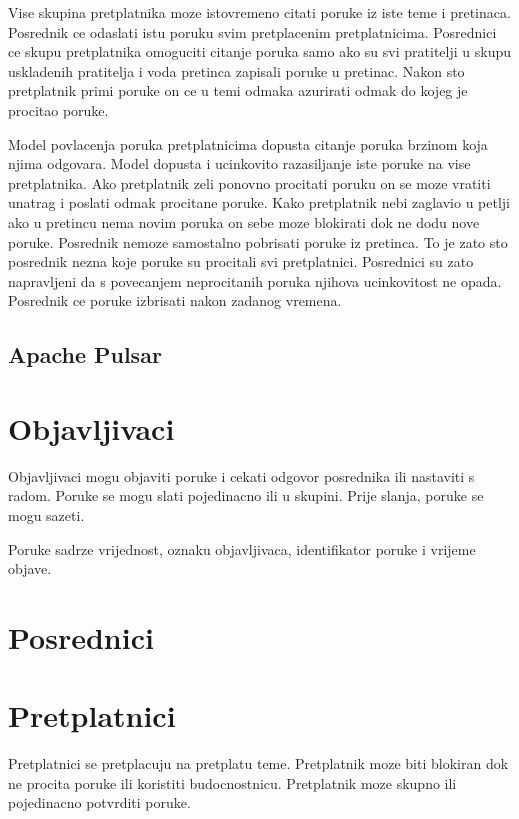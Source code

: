 \documentclass[times, utf8, diplomski, numeric]{fer}
\begin{document}
Vise skupina pretplatnika moze istovremeno citati poruke iz iste teme i pretinaca. Posrednik ce odaslati istu poruku svim pretplacenim pretplatnicima. Posrednici ce skupu pretplatnika omoguciti citanje poruka samo ako su svi pratitelji u skupu uskladenih pratitelja i voda pretinca zapisali poruke u pretinac. Nakon sto pretplatnik primi poruke on ce u temi odmaka azurirati odmak do kojeg je procitao poruke.

Model povlacenja poruka pretplatnicima dopusta citanje poruka brzinom koja njima odgovara. Model dopusta i ucinkovito razasiljanje iste poruke na vise pretplatnika. Ako pretplatnik zeli ponovno procitati poruku on se moze vratiti unatrag i poslati odmak procitane poruke. Kako pretplatnik nebi zaglavio u petlji ako u pretincu nema novim poruka on sebe moze blokirati dok ne dodu nove poruke. Posrednik nemoze samostalno pobrisati poruke iz pretinca. To je zato sto posrednik nezna koje poruke su procitali svi pretplatnici. Posrednici su zato napravljeni da s povecanjem neprocitanih poruka njihova ucinkovitost ne opada. Posrednik ce poruke izbrisati nakon zadanog vremena.



\section{Apache Pulsar}



\chapter{Objavljivaci}
Objavljivaci mogu objaviti poruke i cekati odgovor posrednika ili nastaviti s radom. Poruke se mogu slati pojedinacno ili u skupini. Prije slanja, poruke se mogu sazeti.

Poruke sadrze vrijednost, oznaku objavljivaca, identifikator poruke i vrijeme objave.


\chapter{Posrednici}



\chapter{Pretplatnici}
Pretplatnici se pretplacuju na pretplatu teme. Pretplatnik moze biti blokiran dok ne procita poruke ili koristiti budocnostnicu. Pretplatnik moze skupno ili pojedinacno potvrditi poruke.
\end{document}
